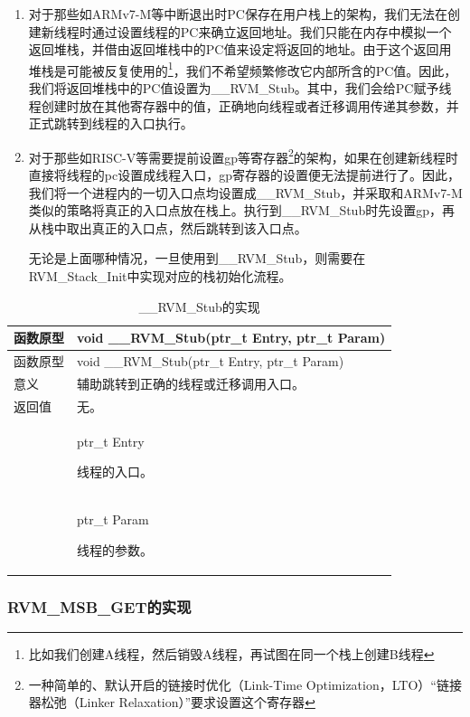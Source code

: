 \begin{enumerate}
\def\labelenumi{\arabic{enumi}.}
\item
  对于那些如ARMv7-M等中断退出时PC保存在用户栈上的架构，我们无法在创建新线程时通过设置线程的PC来确立返回地址。我们只能在内存中模拟一个返回堆栈，并借由返回堆栈中的PC值来设定将返回的地址。由于这个返回用堆栈是可能被反复使用的\footnote{比如我们创建A线程，然后销毁A线程，再试图在同一个栈上创建B线程}，我们不希望频繁修改它内部所含的PC值。因此，我们将返回堆栈中的PC值设置为\_\_RVM\_Stub。其中，我们会给PC赋予线程创建时放在其他寄存器中的值，正确地向线程或者迁移调用传递其参数，并正式跳转到线程的入口执行。
\item
  对于那些如RISC-V等需要提前设置gp等寄存器\footnote{一种简单的、默认开启的链接时优化（Link-Time
    Optimization，LTO）``链接器松弛（Linker
    Relaxation）''要求设置这个寄存器}的架构，如果在创建新线程时直接将线程的pc设置成线程入口，gp寄存器的设置便无法提前进行了。因此，我们将一个进程内的一切入口点均设置成\_\_RVM\_Stub，并采取和ARMv7-M类似的策略将真正的入口点放在栈上。执行到\_\_RVM\_Stub时先设置gp，再从栈中取出真正的入口点，然后跳转到该入口点。

  无论是上面哪种情况，一旦使用到\_\_RVM\_Stub，则需要在RVM\_Stack\_Init中实现对应的栈初始化流程。
\end{enumerate}

\begin{xltabular}{\textwidth}{@{}>{\hsize\raggedright\arraybackslash}X>{\hsize\raggedright\arraybackslash}X@{}}
\caption{\_\allowbreak{}\_\allowbreak{}RVM\_\allowbreak{}Stub的实现}\label{tab:8-8}\\
\toprule
函数原型 & void \_\allowbreak{}\_\allowbreak{}RVM\_\allowbreak{}Stub(ptr\_\allowbreak{}t Entry, ptr\_\allowbreak{}t Param)\tabularnewline
\endfirsthead
\toprule
函数原型 & void \_\allowbreak{}\_\allowbreak{}RVM\_\allowbreak{}Stub(ptr\_\allowbreak{}t Entry, ptr\_\allowbreak{}t Param)\tabularnewline
\midrule
\endhead
\bottomrule
\endlastfoot
意义 & 辅助跳转到正确的线程或迁移调用入口。\tabularnewline
返回值 & 无。\tabularnewline
{} & ptr\_\allowbreak{}t Entry

线程的入口。\strut
\tabularnewline
\strut
 & ptr\_\allowbreak{}t Param

线程的参数。\strut
\tabularnewline
\end{xltabular}

\subsubsection{RVM\_MSB\_GET的实现}\label{subsubsec:8-2-6-3}

